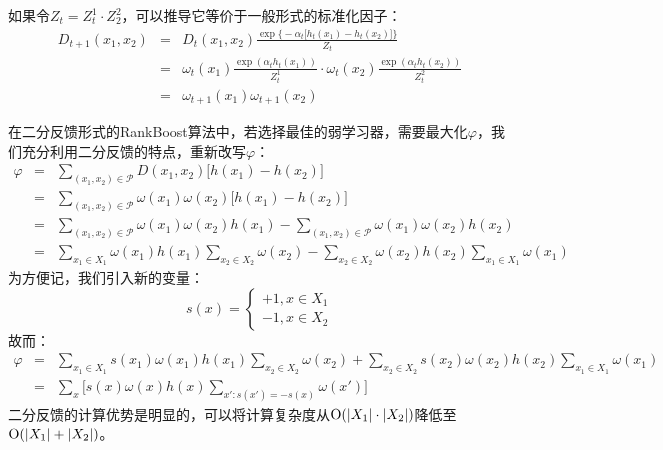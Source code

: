 如果令$Z_t = Z_t^1 \cdot Z_2^2$，可以推导它等价于一般形式的标准化因子：
\begin{equation}
    \begin{array}{lll}
      D_{t+1}(x_1,x_2) & = & D_t(x_1,x_2) \frac{\exp\big\{-\alpha_t \big[h_t(x_1) - h_t(x_2)\big]\big\}}{Z_t} \\
       & = & \omega_t(x_1)\frac{\exp(\alpha_t h_t(x_1))}{Z_t^1} \cdot \omega_t(x_2)\frac{\exp(\alpha_t h_t(x_2))}{Z_t^2}\\
       & = & \omega_{t+1}(x_1)\omega_{t+1}(x_2)
    \end{array}
\end{equation}

在二分反馈形式的RankBoost算法中，若选择最佳的弱学习器，需要最大化$\varphi$，我们充分利用二分反馈的特点，重新改写$\varphi$：
\begin{equation}
    \begin{array}{lll}
      \varphi & = & \sum\limits_{(x_1,x_2)\in \mathscr P} D(x_1,x_2) \big[h(x_1) - h(x_2)\big] \\
       & = & \sum\limits_{(x_1,x_2)\in \mathscr P} \omega(x_1)\omega(x_2) \big[h(x_1) - h(x_2)\big] \\
       & = & \sum\limits_{(x_1,x_2)\in \mathscr P} \omega(x_1)\omega(x_2) h(x_1) - \sum\limits_{(x_1,x_2)\in \mathscr P} \omega(x_1)\omega(x_2) h(x_2) \\
       & = & \sum\limits_{x_1\in X_1} \omega(x_1)h(x_1) \sum\limits_{x_2\in X_2} \omega(x_2) - \sum\limits_{x_2\in X_2} \omega(x_2)h(x_2) \sum\limits_{x_1\in X_1} \omega(x_1)
    \end{array}
\end{equation}
为方便记，我们引入新的变量：
\begin{equation}
    s(x) = \left\{
        \begin{array}{l}
          +1, x \in X_1\\
          -1, x \in X_2
        \end{array}
    \right.
\end{equation}
故而：
\begin{equation}
    \begin{array}{lll}
      \varphi & = & \sum\limits_{x_1\in X_1} s(x_1)\omega(x_1)h(x_1) \sum\limits_{x_2\in X_2} \omega(x_2) + \sum\limits_{x_2\in X_2} s(x_2) \omega(x_2)h(x_2) \sum\limits_{x_1\in X_1} \omega(x_1) \\
      & = & \sum\limits_{x} \bigg[s(x)\omega(x)h(x) \sum\limits_{x':s(x') = -s(x)} \omega(x')\bigg]
    \end{array}
\end{equation}
二分反馈的计算优势是明显的，可以将计算复杂度从$\operatorname{\mathrm{O}}(|X_1|\cdot|X_2|)$降低至$\operatorname{\mathrm{O}}(|X_1| + |X_2|)$。

